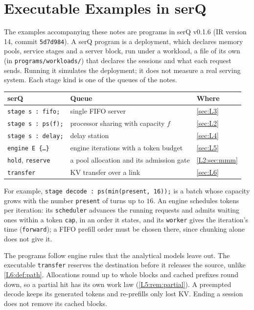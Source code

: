 \appendix
\chapter{Executable Examples in serQ}\label{app:serq}

The examples accompanying these notes are programs in serQ v0.1.6 (IR version 14,
commit \texttt{5d7d984}). A serQ program is a deployment, which declares memory pools,
service stages and a server block, run under a workload, a file of its own (in
\texttt{programs/workloads/}) that declares the sessions and what each request sends. Running it simulates the deployment; it does not measure
a real serving system. Each stage kind is one of the queues of the notes.
\begin{center}\small
\begin{tabular}{@{}lll@{}}
\toprule
serQ & Queue & Where \\
\midrule
\texttt{stage s : fifo;} & single FIFO server & \cref{sec:L3} \\
\texttt{stage s : ps(f);} & processor sharing with capacity $f$ & \cref{sec:L2} \\
\texttt{stage s : delay;} & delay station & \cref{sec:L4} \\
\texttt{engine E \{\dots\}} & engine iterations with a token budget & \cref{sec:L5} \\
\texttt{hold}, \texttt{reserve} & a pool allocation and its admission gate & \cref{L2:sec:mmm} \\
\texttt{transfer} & KV transfer over a link & \cref{sec:L6} \\
\bottomrule
\end{tabular}
\end{center}
For example, \texttt{stage decode : ps(min(present, 16));} is a batch whose capacity
grows with the number \texttt{present} of turns up to $16$. An engine schedules
tokens per iteration: its \texttt{scheduler} advances the running requests and admits
waiting ones within a token \texttt{cap}, in an order it states, and its \texttt{worker}
gives the iteration's time (\texttt{forward}); a FIFO prefill order must be chosen
there, since chunking alone does not give it.

The programs follow engine rules that the analytical models leave out. The
executable \texttt{transfer} reserves the destination before it releases the source,
unlike \cref{L6:def:path}. Allocations round up to whole blocks and cached prefixes round
down, so a partial hit has its own work law (\cref{L5:rem:partial}). A preempted decode
keeps its generated tokens and re-prefills only lost KV. Ending a session does not
remove its cached blocks.

